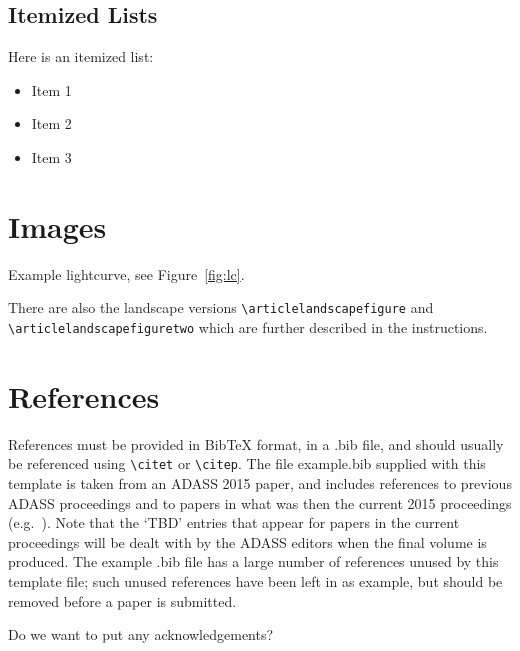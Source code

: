 \documentclass[11pt,twoside]{article}
\begin{document}
\subsection{Itemized Lists}
Here is an itemized list:
\begin{itemize}
\item Item 1
\item Item 2
\item Item 3
\end{itemize}


\section{Images}

Example lightcurve, see Figure~\ref{fig:lc}.


\clearpage %

There are also the landscape versions \verb"\articlelandscapefigure" and \\
\verb"\articlelandscapefiguretwo" which are further described in the instructions.

\section{References}

References must be provided in BibTeX format, in a .bib file, and should usually be referenced using \verb"\citet" or \verb"\citep". The file example.bib supplied with this template is taken from an ADASS 2015 paper, and includes references to previous ADASS proceedings 
\citep[such as][]{1999ASPC..172..487P} and to papers in what was then the current 2015 proceedings (e.g.\ \citet{O11-4_adassxxv}). Note that the `TBD' entries that appear for papers in the current proceedings will be dealt with by the ADASS editors when the final volume is produced. The example .bib file has a large number of references unused by this template file; such unused references have been left in as example, but should be removed before a paper is submitted.

\acknowledgements Do we want to put any acknowledgements?


\end{document}
